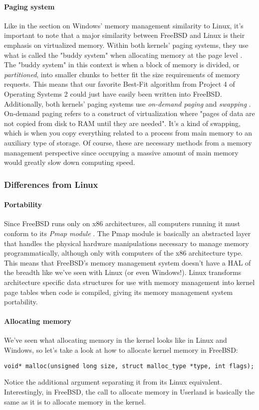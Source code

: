 \documentclass[letterpaper,10pt,titlepage]{article}
\begin{document}
\paragraph{Paging system}
Like in the section on Windows' memory management similarity to Linux, it's important to note that a major similarity between FreeBSD and Linux is their emphasis on virtualized memory. Within both kernels' paging systems, they use what is called the "buddy system" when allocating memory at the page level \cite{freeBSD1} \cite{linux2}. The "buddy system" in this context is when a block of memory is divided, or \emph{partitioned}, into smaller chunks to better fit the size requirements of memory requests. This means that our favorite Best-Fit algorithm from Project 4 of Operating Systems 2 could just have easily been written into FreeBSD. Additionally, both kernels' paging systems use \emph{on-demand paging} and \emph{swapping} \cite{freeBSD2} \cite{linux1}. On-demand paging refers to a construct of virtualization where "pages of data are not copied from disk to RAM until they are needed". It's a kind of swapping, which is when you copy everything related to a process from main memory to an auxiliary type of storage. Of course, these are necessary methods from a memory management perspective since occupying a massive amount of main memory would greatly slow down computing speed. 

% 
%
%
\subsubsection{Differences from Linux}
\paragraph{Portability}
Since FreeBSD runs only on x86 architectures, all computers running it must conform to its \emph{Pmap module} \cite{freeBSD1}. The Pmap module is basically an abstracted layer that handles the physical hardware manipulations necessary to manage memory programmatically, although only with computers of the x86 architecture type. This means that FreeBSD's memory management system doesn't have a HAL of the breadth like we've seen with Linux (or even Windows!). Linux transforms architecture specific data structures for use with memory management into kernel page tables when code is compiled, giving its memory management system portability. 
\paragraph{Allocating memory}
We've seen what allocating memory in the kernel looks like in Linux and Windows, so let's take a look at how to allocate kernel memory in FreeBSD: \cite{freeBSD2}
\begin{lstlisting}
void* malloc(unsigned long size, struct malloc_type *type, int flags);
\end{lstlisting}
Notice the additional argument separating it from its Linux equivalent. Interestingly, in FreeBSD, the call to allocate memory in Userland is basically the same as it is to allocate memory in the kernel. 
\end{document}
